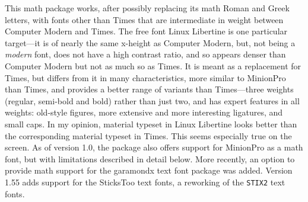 \documentclass[\fsc]{article}
\theoremstyle{oldplain}
\theoremstyle{plain}
\begin{document}
This math package works, after possibly replacing its math Roman and Greek letters, with fonts other than Times that are intermediate in weight between Computer Modern and Times. The free font Linux Libertine is one particular target---it is of nearly the same x-height as Computer Modern, but, not being a \emph{modern} font, does not have a high contrast ratio, and so appears  denser than Computer Modern but not as much so as Times. It is meant as a replacement for Times, but  differs from it in many characteristics, more similar to MinionPro than Times, and provides a better range of variants than Times---three weights (regular, semi-bold and bold) rather than just two, and has expert features in all weights: old-style figures, more extensive and more interesting ligatures,  and  small caps. In my opinion, material typeset in Linux Libertine looks better than the corresponding material typeset in Times. This seems especially true on the screen. As of version 1.0, the package also offers support for MinionPro as a math font, but with limitations described in detail below. More recently, an option to provide math support for the \textsf{garamondx} text font package was added. Version 1.55 adds support for the {SticksToo} text fonts, a reworking of the {\tt STIX2} text fonts.
\end{document}
